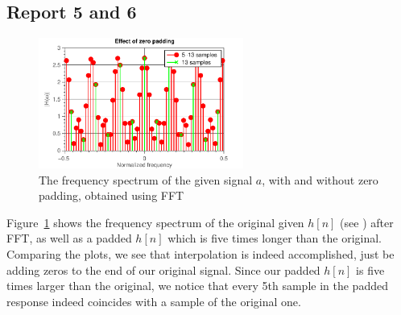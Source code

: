 \documentclass[11pt,titlepage]{report}
\begin{document}
\subsection{Report 5 and 6}

\begin{figure}[H]
	\centering
	\includegraphics[width=0.6\textwidth]{../../deliverable-7-resources/figures/ass-1/report-5-6/ass-1-report-5-6.pdf}
	\caption{The frequency spectrum of the given signal $a$, with and without zero padding, obtained using FFT}
	\label{fig:rep5-6-spectrum}
\end{figure}

Figure~\ref{fig:rep5-6-spectrum} shows the frequency spectrum of the original given $h[n]$ (see \cite[94]{epo4-manual}) after FFT, as well as a padded $h[n]$ which is five times longer than the original. Comparing the plots, we see that interpolation is indeed accomplished, just be adding zeros to the end of our original signal. Since our padded $h[n]$ is five times larger than the original, we notice that every 5th sample in the padded response indeed coincides with a sample of the original one.
\end{document}
